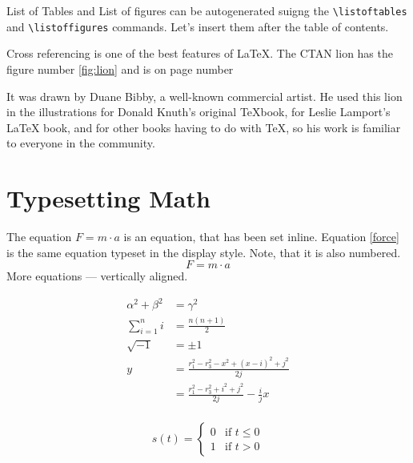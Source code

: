 \documentclass[11pt,a4paper,twoside]{article}
\begin{document}
List of Tables and List of figures can be autogenerated suigng the \verb+\listoftables+ and \verb+\listoffigures+ commands. Let's insert them after the table of contents. 

Cross referencing is one of the best features of \LaTeX. The CTAN lion has the figure number \ref{fig:lion} and is on page number \pageref{fig:lion}

It was drawn by Duane Bibby, a well-known commercial artist. He used this lion in the illustrations for Donald Knuth's original TeXbook\cite{Knuth84}, for Leslie Lamport's LaTeX book\cite{Lamport94}, and for other books having to do with TeX, so his work is familiar to everyone in the community. 

  

\section{Typesetting Math}
The equation $F=m \cdot a$ is an equation, that has been set inline. 
Equation \eqref{force} is the same equation typeset in the display style. Note, that it is also numbered. 
\begin{equation}
\label{force}
F=m\cdot a
\end{equation}
More equations --- vertically aligned. 

\begin{align}
\alpha^2 + \beta^2 &= \gamma^2 \\
\sum_{i=1}^ni &= \frac{n(n+1)}{2}\\
\sqrt{-1} &= \pm1 \nonumber \\
y &= \frac{r_1^2-r_3^2-x^2+(x-i)^2+j^2}{2j} \nonumber \\
  &= \frac{r_1^2-r_3^2+i^2+j^2}{2j}-\frac{i}{j}x \\
\end{align}

\begin{equation*}
s(t) = \left\{
 \begin{array}{rl}
   0 & \text{if } t \le 0\\
   1 & \text{if } t > 0
 \end{array} \right.
\end{equation*}
\end{document}
